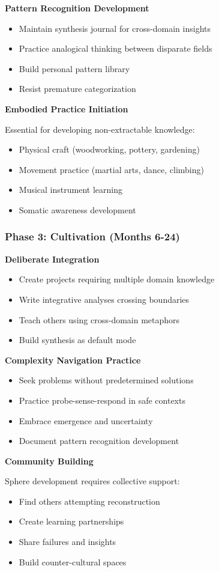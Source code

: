\textbf{Pattern Recognition Development}
\begin{itemize}
\item Maintain synthesis journal for cross-domain insights
\item Practice analogical thinking between disparate fields
\item Build personal pattern library
\item Resist premature categorization
\end{itemize}

\textbf{Embodied Practice Initiation}

Essential for developing non-extractable knowledge:
\begin{itemize}
\item Physical craft (woodworking, pottery, gardening)
\item Movement practice (martial arts, dance, climbing)
\item Musical instrument learning
\item Somatic awareness development
\end{itemize}

\subsubsection{Phase 3: Cultivation (Months 6-24)}

\textbf{Deliberate Integration}
\begin{itemize}
\item Create projects requiring multiple domain knowledge
\item Write integrative analyses crossing boundaries
\item Teach others using cross-domain metaphors
\item Build synthesis as default mode
\end{itemize}

\textbf{Complexity Navigation Practice}
\begin{itemize}
\item Seek problems without predetermined solutions
\item Practice probe-sense-respond in safe contexts
\item Embrace emergence and uncertainty
\item Document pattern recognition development
\end{itemize}

\textbf{Community Building}

Sphere development requires collective support:
\begin{itemize}
\item Find others attempting reconstruction
\item Create learning partnerships
\item Share failures and insights
\item Build counter-cultural spaces
\end{itemize}

